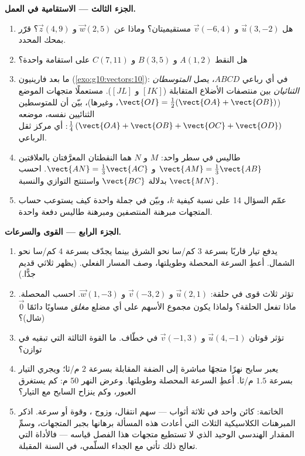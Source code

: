 \begin{problem}
\medskip
\noindent\textbf{الجزء الثالث --- الاستقامية في العمل.}
\begin{enumerate}[resume]
  \item هل $\vec u(3, -2)$ و $\vec v(-6, 4)$ مستقيميتان؟ وماذا عن
        $\vec w(2, 5)$ و $\vec z(4, 9)$؟ قرّر بمحك
        المحدد.
  \item هل النقط $A(1, 2)$ و $B(3, 5)$ و $C(7, 11)$
        على استقامة واحدة؟
  \item ما بعد فارينيون (\cref{exo:g10:vectors:10}): في أي
        رباعي $ABCD$، يصل \emph{المتوسطان الثنائيان} بين
        منتصفات الأضلاع المتقابلة ($[IK]$ و $[JL]$). مستعملًا
        متجهات الموضع ($\vect{OI} = \frac12(\vect{OA} +
        \vect{OB})$، وغيرها)، بيّن أن للمتوسطين الثنائيين
         نفسه،  موضعه
        $\frac14\left(\vect{OA} + \vect{OB} + \vect{OC} +
        \vect{OD}\right)$: أي مركز ثقل الرباعي.
  \item طاليس في سطر واحد: $M$ و $N$ هما النقطتان المعرَّفتان
        بالعلاقتين $\vect{AM} = \frac13\vect{AB}$ و
        $\vect{AN} = \frac13\vect{AC}$. احسب
        $\vect{MN}$ بدلالة $\vect{BC}$ واستنتج
        التوازي والنسبة.
  \item عمّم السؤال 14 على نسبة كيفية $k$، وبيّن
        في جملة واحدة كيف يستوعب حساب المتجهات
        مبرهنة المنتصفين ومبرهنة
        طاليس دفعة واحدة.
\end{enumerate}

\medskip
\noindent\textbf{الجزء الرابع --- القوى والسرعات.}
\begin{enumerate}[resume]
  \item يدفع تيار قاربًا بسرعة $3$ كم/سا نحو الشرق
        بينما يجدّف بسرعة $4$ كم/سا نحو الشمال. أعطِ 
        السرعة المحصلة وطويلتها، وصف المسار
        الفعلي. (يظهر ثلاثي قديم جدًّا.)
  \item تؤثر ثلاث قوى في حلقة: $\vec u(2, 1)$ و
        $\vec v(-3, 2)$ و $\vec w(1, -3)$. احسب المحصلة.
        ماذا تفعل الحلقة؟ ولماذا يكون مجموع الأسهم
        على أي مضلع \emph{مغلق} مساويًا دائمًا $\vec 0$
        (شال)؟
  \item تؤثر قوتان $\vec u(4, -1)$ و $\vec v(-1, 3)$ في
        خطّاف. ما القوة الثالثة التي تبقيه في توازن؟
  \item يعبر سابح نهرًا متجهًا مباشرة إلى الضفة المقابلة بسرعة
        $2$ م/ثا؛ ويجري التيار بسرعة $1.5$ م/ثا. أعطِ
        السرعة المحصلة وطويلتها. وعرض النهر
        $50$ م: كم يستغرق العبور، وكم
        ينزاح السابح مع التيار؟
  \item الخاتمة: كائن واحد في ثلاثة أثواب --- سهم
        انتقال، وزوج ، وقوة أو سرعة. اذكر
        المبرهنات الكلاسيكية الثلاث التي أعادت هذه المسألة برهانها
        بجبر المتجهات، وسمِّ المقدار الهندسي الوحيد الذي لا
        تستطيع متجهات هذا الفصل قياسه --- فالأداة التي
        تعالج ذلك تأتي مع الجداء السلّمي، في السنة المقبلة.
\end{enumerate}
\end{problem}
